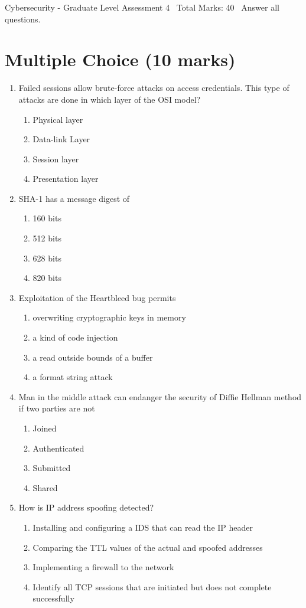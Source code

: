 \documentclass[12pt]{article}
\begin{document}
\begin{center}
Cybersecurity - Graduate Level Assessment 4 \
Total Marks: 40 \
Answer all questions.
\end{center}

\section*{Multiple Choice (10 marks)}
\begin{enumerate}[label=\arabic*.]
\item Failed sessions allow brute-force attacks on access credentials. This type of attacks are done in which layer of the OSI model?
\begin{enumerate}[label=(\alph*)]
    \item Physical layer
    \item Data-link Layer
    \item Session layer
    \item Presentation layer
\end{enumerate}
\item SHA-1 has a message digest of
\begin{enumerate}[label=(\alph*)]
    \item 160 bits
    \item 512 bits
    \item 628 bits
    \item 820 bits
\end{enumerate}
\item Exploitation of the Heartbleed bug permits
\begin{enumerate}[label=(\alph*)]
    \item overwriting cryptographic keys in memory
    \item a kind of code injection
    \item a read outside bounds of a buffer
    \item a format string attack
\end{enumerate}
\item Man in the middle attack can endanger the security of Diffie Hellman method if two parties are not
\begin{enumerate}[label=(\alph*)]
    \item Joined
    \item Authenticated
    \item Submitted
    \item Shared
\end{enumerate}
\item How is IP address spoofing detected?
\begin{enumerate}[label=(\alph*)]
    \item Installing and configuring a IDS that can read the IP header
    \item Comparing the TTL values of the actual and spoofed addresses
    \item Implementing a firewall to the network
    \item Identify all TCP sessions that are initiated but does not complete successfully
\end{enumerate}
\end{enumerate}
\end{document}
